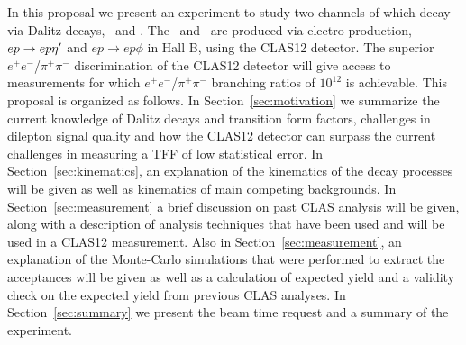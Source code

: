 \indent In this proposal we present an experiment to study two channels of which decay via Dalitz decays, \etaDal \ and \phiDal. The \etaT \ and \phiT \ are produced via electro-production, $ep \rightarrow ep\eta^{\prime}$ and $ep \rightarrow ep\phi$ in Hall B, using the CLAS12 detector. The superior $e^+e^-$/$\pi^+\pi^-$ discrimination of the CLAS12 detector will give access to measurements for which  $e^+e^-$/$\pi^+\pi^-$ branching ratios of $10^{12}$ is achievable.
This proposal is organized as follows. In Section~\ref{sec:motivation} we summarize the current knowledge of Dalitz decays and transition form factors, challenges in dilepton signal quality and how the CLAS12 detector can surpass the current challenges in measuring a TFF of low statistical error. In Section~\ref{sec:kinematics}, an explanation of the kinematics of the decay processes will be given as well as kinematics of main competing backgrounds. In Section~\ref{sec:measurement} a brief discussion on past CLAS analysis will be given, along with a description of analysis techniques that have been used and will be used in a CLAS12 measurement. Also in Section~\ref{sec:measurement}, an explanation of the Monte-Carlo simulations that were performed to extract the acceptances will be given as well as a calculation of expected yield and a validity check on the expected yield from previous CLAS analyses. In Section~\ref{sec:summary} we present the beam time request and a summary of the experiment.



